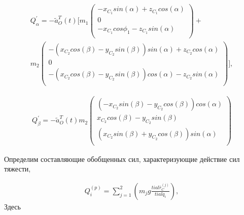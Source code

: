 \begin{equation} %
\label{eq:p3:32}
\begin{multlined}
Q_{ \alpha }^{'}=
-\tilde{a}_{O}^{T} ( t ) 
[ 
m_{1} \left( 
\begin{matrix}
	-x_{C_{1}}sin ( \alpha ) +z_{C_{1}}cos ( \alpha ) \\
	0\\
	-x_{C_{1}}cos \phi _{1}-z_{C_{1}}sin ( \alpha ) \\
\end{matrix}
\right) + \\ 
 m_{2} 
\left( 
\begin{matrix}
	- ( x_{C_{2}}cos ( \beta ) -y_{C_{2}}sin ( \beta ) ) sin ( \alpha ) +z_{C_{2}}cos ( \alpha ) \\
	0 \\
	- ( x_{C_{2}}cos ( \beta ) -y_{C_{2}}sin ( \beta ) ) cos ( \alpha ) -z_{C_{2}}sin ( \alpha ) \\
\end{matrix} 
\right) 
],
\end{multlined}
\end{equation}

\begin{equation} %
\label{eq:p3:33}
\begin{multlined}
Q_{ \beta }^{'}=-\tilde{a}_{O}^{T} \left( t \right) m_{2} \left( \begin{matrix}
\left( -x_{C_{2}}sin \left( \beta \right) -y_{C_{2}}cos \left( \beta \right) \right) cos \left( \alpha \right) \\
x_{C_{2}}cos \left( \beta \right) -y_{C_{2}}sin \left( \beta \right) \\
\left( x_{C_{2}}sin \left( \beta \right) +y_{C_{2}}cos \left( \beta \right) \right) sin \left( \alpha \right) \\
\end{matrix}
\right) 
\end{multlined}
\end{equation}

Определим составляющие обобщенных сил, характеризующие действие сил тяжести, 


\begin{equation} %
\label{eq:p3:34}
\begin{multlined}
Q_{i}^{ \left( p \right) }= \sum _{j=1}^{2} \left( m_{j}g \frac{ tial \bar{r}_{C}^{ \left( j \right) }}{ tial q_{i}} \right),
\end{multlined}
\end{equation}
Здесь 


